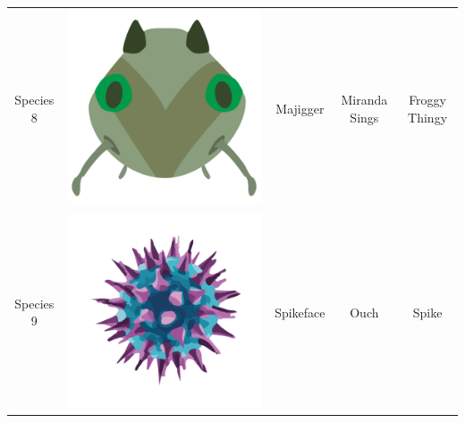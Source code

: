 \begin{table}
\begin{tabular}{ | c | c | c | c | c | }
Species 8  & \includegraphics[valign=m,scale=0.1]{images/species_08.png} & Majigger & Miranda Sings & Froggy Thingy \\ 
Species 9  & \includegraphics[valign=m,scale=0.1]{images/species_09.png} & Spikeface & Ouch & Spike \\ 

\end{tabular}
\end{table}
